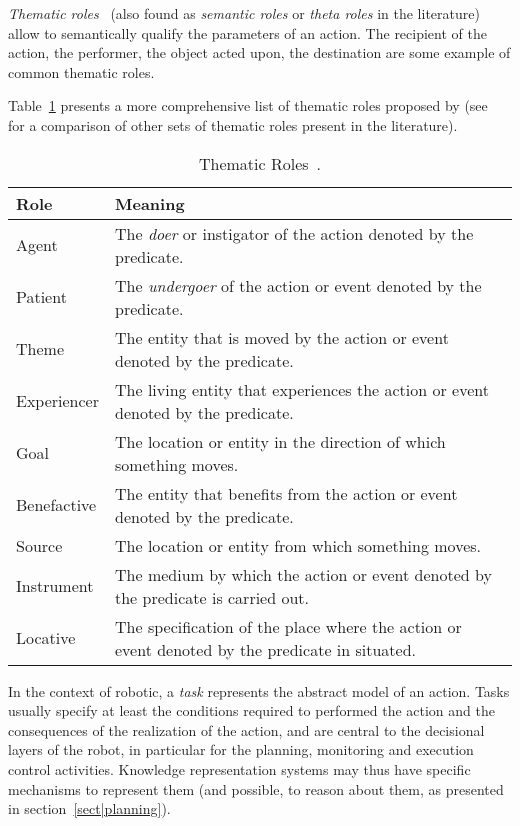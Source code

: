 \emph{Thematic roles}~\cite{Gruber1965} (also found as \emph{semantic roles} or
\emph{theta roles} in the literature) allow to semantically qualify the
parameters of an action. The recipient of the action, the performer, the object
acted upon, the destination are some example of common thematic roles.

Table~\ref{table|theta-roles} presents a more comprehensive list of thematic
roles proposed by \cite{Aarts1997} (see~\cite{Gutierrez2001} for a comparison
of other sets of thematic roles present in the literature).

\begin{table}
\begin{center}

\begin{tabular}{lp{12cm}}

\toprule
       Role & Meaning \\
\midrule
      Agent & The \emph{doer} or instigator of the action denoted by the predicate. \\
    Patient & The \emph{undergoer} of the action or event denoted by the predicate. \\
      Theme & The entity that is moved by the action or event denoted by the predicate. \\
Experiencer & The living entity that experiences the action or event denoted by the predicate. \\
       Goal & The location or entity in the direction of which something moves. \\
Benefactive & The entity that benefits from the action or event denoted by the predicate. \\
     Source & The location or entity from which something moves. \\
 Instrument & The medium by which the action or event denoted by the predicate is carried out. \\
   Locative & The specification of the place where the action or event denoted by the predicate in situated. \\
\bottomrule

\end{tabular}
\end{center}
\caption{Thematic Roles~\cite{Aarts1997}.}
\label{table|theta-roles}
\end{table}

In the context of robotic, a \emph{task} represents the abstract model of an
action. Tasks usually specify at least the conditions required to performed the
action and the consequences of the realization of the action, and are central
to the decisional layers of the robot, in particular for the planning,
monitoring and execution control activities. Knowledge representation systems
may thus have specific mechanisms to represent them (and possible, to reason
about them, as presented in section~\ref{sect|planning}).

